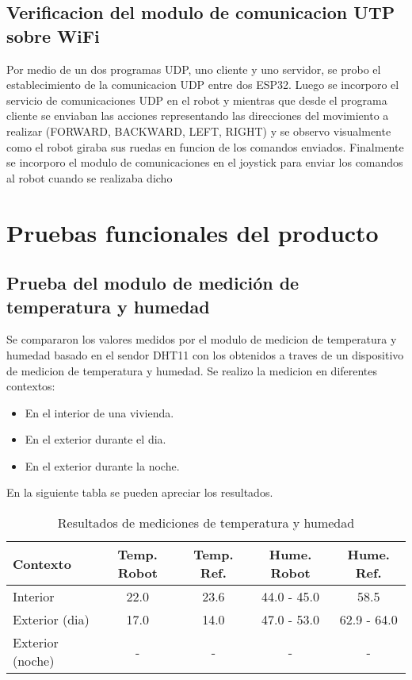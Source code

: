\subsection{Verificacion del modulo de comunicacion UTP sobre WiFi}
Por medio de un dos programas UDP, uno cliente y uno servidor, se probo el establecimiento de la comunicacion UDP entre dos ESP32. Luego se incorporo el servicio de comunicaciones UDP en el robot y mientras que desde el programa cliente se enviaban las acciones representando las direcciones del movimiento a realizar (FORWARD, BACKWARD, LEFT, RIGHT) y se observo visualmente como el robot giraba sus ruedas en funcion de los comandos enviados. Finalmente se incorporo el modulo de comunicaciones en el joystick para enviar los comandos al robot cuando se realizaba dicho


\section{Pruebas funcionales del producto}


\subsection{Prueba del modulo de medición de temperatura y humedad}

Se compararon los valores medidos por el modulo de medicion de temperatura y humedad basado en el sendor DHT11 con los obtenidos a traves de un dispositivo de medicion de temperatura y humedad. Se realizo la medicion en diferentes contextos:

\begin{itemize}
	\item En el interior de una vivienda.
	\item En el exterior durante el dia.
	\item En el exterior durante la noche.
\end{itemize}

En la siguiente tabla se pueden apreciar los resultados.

\begin{table}[h]
\centering
\caption[Resultados de mediciones de temperatura y humedad]{Resultados de mediciones de temperatura y humedad}
\begin{tabular}{l c c c c}
\toprule
\textbf{Contexto} & \textbf{Temp. Robot} & \textbf{Temp. Ref.} & \textbf{Hume. Robot}  & \textbf{Hume. Ref.}\\
\midrule
Interior & 22.0 & 23.6 & 44.0 - 45.0 & 58.5 \\
Exterior (dia) & 17.0  & 14.0 & 47.0 - 53.0 & 62.9 - 64.0 \\
Exterior (noche) & - & - & - & - \\
\bottomrule
\hline
\end{tabular}
\end{table}

